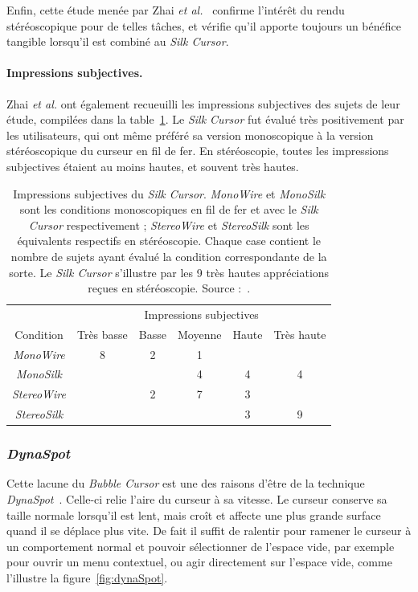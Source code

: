 	Enfin, cette étude menée par Zhai \emph{et al.}~\cite{zhai1994silk} confirme l'intérêt du rendu stéréoscopique pour de telles tâches, et vérifie qu'il apporte toujours un bénéfice tangible lorsqu'il est combiné au \emph{Silk Cursor}.
	
	\paragraph{Impressions subjectives.}
	Zhai \emph{et al.} ont également recueuilli les impressions subjectives des sujets de leur étude, compilées dans la table~\ref{tab:silkImpr}. Le \emph{Silk Cursor} fut évalué très positivement par les utilisateurs, qui ont même préféré sa version monoscopique à la version stéréoscopique du curseur en fil de fer. En stéréoscopie, toutes les impressions subjectives étaient au moins hautes, et souvent très hautes.

	\begin{table}
	\centering
	\begin{tabular}{c | c c c c c}
							& \multicolumn{5}{c}{Impressions subjectives} \\
		Condition			& Très basse	& Basse	& Moyenne	& Haute	& Très haute \bigstrut[b] \\ \hline
		\emph{MonoWire}		& 8				& 2		& 1			&		& \bigstrut[t]	\\
		\emph{MonoSilk}		& 				& 		& 4			& 4		& 4 			\\
		\emph{StereoWire}	& 				& 2		& 7			& 3		& 	 			\\
		\emph{StereoSilk}	& 				& 		& 			& 3		& 9 			\\
	\end{tabular}
	\caption[\emph{Silk Cursor} -- impressions subjectives]{Impressions subjectives du \emph{Silk Cursor}. \emph{MonoWire} et \emph{MonoSilk} sont les conditions monoscopiques en fil de fer et avec le \emph{Silk Cursor} respectivement ; \emph{StereoWire} et \emph{StereoSilk} sont les équivalents respectifs en stéréoscopie. Chaque case contient le nombre de sujets ayant évalué la condition correspondante de la sorte. Le \emph{Silk Cursor} s'illustre par les 9 très hautes appréciations reçues en stéréoscopie. Source :~\cite{zhai1994silk}.}
	\label{tab:silkImpr}
	\end{table}

	\subsubsection{\emph{DynaSpot}}
	Cette lacune du \emph{Bubble Cursor} est une des raisons d'être de la technique \emph{DynaSpot}~\cite{chapuis2009dynaspot}. Celle-ci relie l'aire du curseur à sa vitesse. Le curseur conserve sa taille normale lorsqu'il est lent, mais croît et affecte une plus grande surface quand il se déplace plus vite. De fait il suffit de ralentir pour ramener le curseur à un comportement \og normal \fg{} et pouvoir sélectionner de l'espace vide, par exemple pour ouvrir un menu contextuel, ou agir directement sur l'espace vide, comme l'illustre la figure~\ref{fig:dynaSpot}.
	
